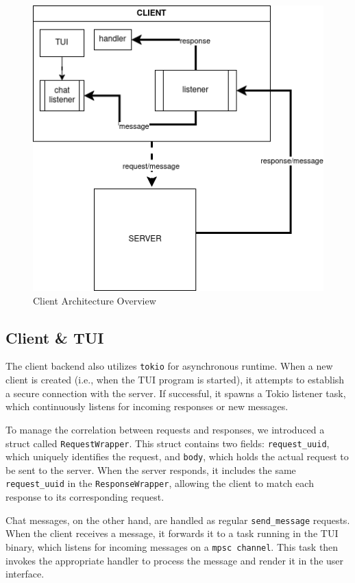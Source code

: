 \begin{figure}
  \centering
  \includegraphics[width=0.8\linewidth]{imgs/client-arch.png}
  \caption{Client Architecture Overview}
  \label{fig:client-architecture-overview}
\end{figure}

\subsection{Client \& TUI}
\label{subsec:ClientTUI}

The client backend also utilizes \texttt{tokio} for asynchronous runtime. When a new client is created (i.e., when the TUI program is started), it attempts to establish a secure connection with the server. If successful, it spawns a Tokio listener task, which continuously listens for incoming responses or new messages.  

To manage the correlation between requests and responses, we introduced a struct called \texttt{RequestWrapper}. This struct contains two fields: \texttt{request\_uuid}, which uniquely identifies the request, and \texttt{body}, which holds the actual request to be sent to the server. When the server responds, it includes the same \texttt{request\_uuid} in the \texttt{ResponseWrapper}, allowing the client to match each response to its corresponding request.  

Chat messages, on the other hand, are handled as regular \texttt{send\_message} requests. When the client receives a message, it forwards it to a task running in the TUI binary, which listens for incoming messages on a \texttt{mpsc channel}. This task then invokes the appropriate handler to process the message and render it in the user interface.
\newpage

